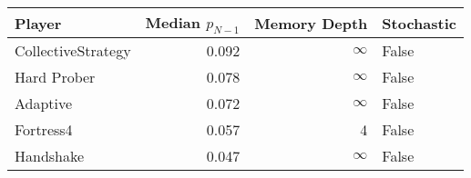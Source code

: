 \begin{tabular}{lrrl}
\toprule
             Player &  Median $p_{N-1}$ &  Memory Depth & Stochastic \\
\midrule
 CollectiveStrategy &             0.092 &            \(\infty\) &      False \\
        Hard Prober &             0.078 &            \(\infty\) &      False \\
           Adaptive &             0.072 &            \(\infty\) &      False \\
          Fortress4 &             0.057 &             4 &      False \\
          Handshake &             0.047 &            \(\infty\) &      False \\
\bottomrule
\end{tabular}
